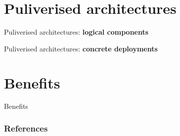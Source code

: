 \documentclass[aspectratio=169]{beamer}
\begin{document}
\section{Puliverised architectures}
\begin{frame}{Puliverised architectures: \textbf{logical components}}

\end{frame}
\begin{frame}{Puliverised architectures: \textbf{concrete deployments}}
\end{frame}

\section{Benefits}
\begin{frame}{Benefits}
\end{frame}


\begin{frame}[allowframebreaks]
\frametitle{References}
%
% 
\printbibliography
\end{frame}
\end{document}
